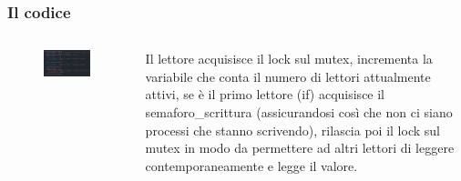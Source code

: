 \documentclass[10pt]{beamer}
\begin{document}
\begin{frame}[fragile]
	\frametitle{Il codice}
		\begin{columns}
		\begin{column}{0.3\textwidth}
			
			\begin{figure}
				\centering
				\includegraphics[width=2\linewidth]{img/lettore}
			\end{figure}
			
		\end{column}\hspace{100pt}
		\begin{column}{0.3\textwidth}
			Il lettore acquisisce il lock sul mutex, incrementa la variabile che conta il numero di lettori attualmente attivi, se è il primo lettore (if) acquisisce il semaforo\_scrittura (assicurandosi così che non ci siano processi che stanno scrivendo), rilascia poi il lock sul mutex in modo da permettere ad altri lettori di leggere contemporaneamente e legge il valore.
		\end{column}
	\end{columns}
	
\end{frame}
\end{document}
